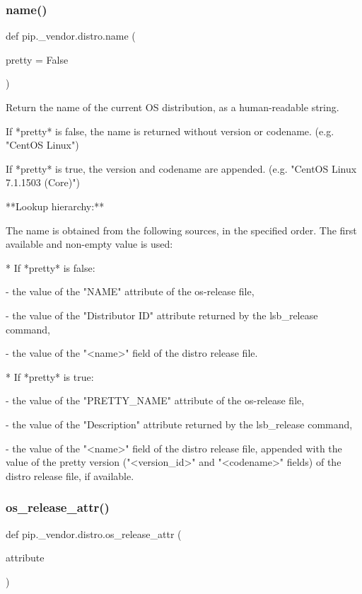 \subsubsection{\texorpdfstring{name()}{name()}}
{\footnotesize\ttfamily def pip.\+\_\+vendor.\+distro.\+name (\begin{DoxyParamCaption}\item[{}]{pretty = {\ttfamily False} }\end{DoxyParamCaption})}

\begin{DoxyVerb}Return the name of the current OS distribution, as a human-readable
string.

If *pretty* is false, the name is returned without version or codename.
(e.g. "CentOS Linux")

If *pretty* is true, the version and codename are appended.
(e.g. "CentOS Linux 7.1.1503 (Core)")

**Lookup hierarchy:**

The name is obtained from the following sources, in the specified order.
The first available and non-empty value is used:

* If *pretty* is false:

  - the value of the "NAME" attribute of the os-release file,

  - the value of the "Distributor ID" attribute returned by the lsb_release
    command,

  - the value of the "<name>" field of the distro release file.

* If *pretty* is true:

  - the value of the "PRETTY_NAME" attribute of the os-release file,

  - the value of the "Description" attribute returned by the lsb_release
    command,

  - the value of the "<name>" field of the distro release file, appended
    with the value of the pretty version ("<version_id>" and "<codename>"
    fields) of the distro release file, if available.
\end{DoxyVerb}
 \mbox{\label{namespacepip_1_1__vendor_1_1distro_a926e6197f91b1b04018c4423247847d2}} 
\subsubsection{\texorpdfstring{os\+\_\+release\+\_\+attr()}{os\_release\_attr()}}
{\footnotesize\ttfamily def pip.\+\_\+vendor.\+distro.\+os\+\_\+release\+\_\+attr (\begin{DoxyParamCaption}\item[{}]{attribute }\end{DoxyParamCaption})}


